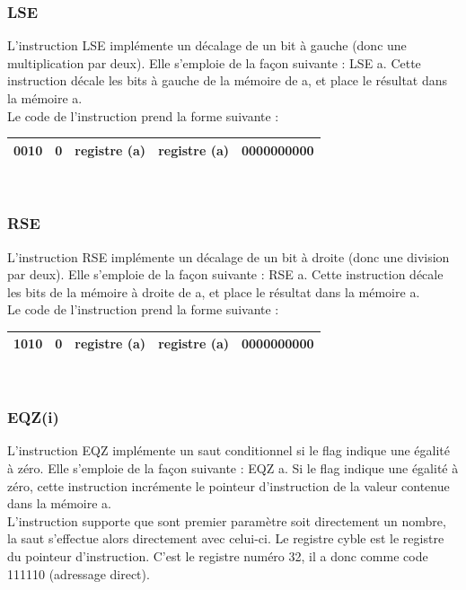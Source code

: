 \documentclass[a4paper, 12pt, twoside]{report}
\begin{document}
\subsubsection{LSE}

L'instruction LSE implémente un décalage de un bit à gauche (donc une multiplication par deux). 
Elle s'emploie de la façon suivante : LSE a. Cette instruction décale les bits à gauche de la mémoire 
de a, et place le résultat dans la mémoire a.\\

Le code de l'instruction prend la forme suivante :

\begin{tabular}{|c|c|c|c|c|}
  \hline
  0010 & 0 & registre (a) & registre (a) & 0000000000 \\
  \hline
\end{tabular}\\

\subsubsection{RSE}

L'instruction RSE implémente un décalage de un bit à droite (donc une division par deux). 
Elle s'emploie de la façon suivante : RSE a. Cette instruction décale les bits de la mémoire 
à droite de a, et place le résultat dans la mémoire a.\\

Le code de l'instruction prend la forme suivante :

\begin{tabular}{|c|c|c|c|c|}
  \hline
  1010 & 0 & registre (a) & registre (a) & 0000000000 \\
  \hline
\end{tabular}\\

\subsubsection{EQZ(i)}

L'instruction EQZ implémente un saut conditionnel si le flag indique une égalité à zéro. 
Elle s'emploie de la façon suivante : EQZ a. Si le flag indique une égalité à zéro, 
cette instruction incrémente le pointeur d'instruction de la valeur contenue dans 
la mémoire a.\\
L'instruction supporte que sont premier paramètre soit directement un nombre, la saut
s'effectue alors directement avec celui-ci. Le registre cyble est le registre du pointeur 
d'instruction. C'est le registre numéro 32, il a donc comme code 111110 (adressage direct).\\
\end{document}
